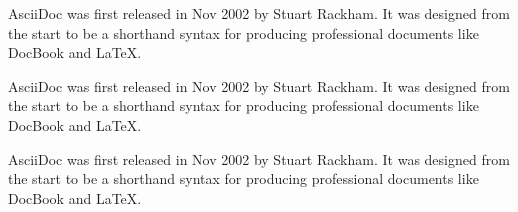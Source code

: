 \begin{sidebar}
AsciiDoc was first released in Nov 2002 by Stuart Rackham.
It was designed from the start to be a shorthand syntax
for producing professional documents like DocBook and LaTeX.
\end{sidebar}

\begin{sidebar}
AsciiDoc was first released in Nov 2002 by Stuart Rackham.
It was designed from the start to be a shorthand syntax
for producing professional documents like DocBook and LaTeX.
\end{sidebar}

\begin{sidebar}
AsciiDoc was first released in Nov 2002 by Stuart Rackham.
It was designed from the start to be a shorthand syntax
for producing professional documents like DocBook and LaTeX.
\end{sidebar}
